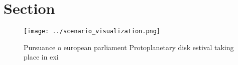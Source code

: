 \documentclass[a4paper]{article}
\begin{document}
\section{Section}

\begin{figure}
\centering
\texttt{[image: ../scenario\_visualization.png]}
\caption{Pursuance o european parliament Protoplanetary disk estival taking place in exi
}
\end{figure}
 
\end{document}
